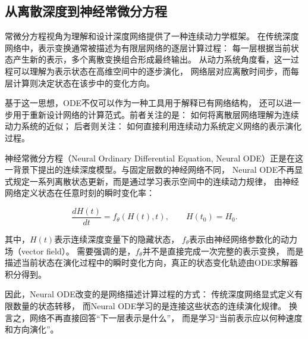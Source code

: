 \documentclass[UTF8,a4paper,zihao=-4,oneside,openany]{ctexbook}
\begin{document}
\subsection{从离散深度到神经常微分方程}

常微分方程视角为理解和设计深度网络提供了一种连续动力学框架。
在传统深度网络中，表示变换通常被描述为有限层网络的逐层计算过程：
每一层根据当前状态产生新的表示，多个离散变换组合形成最终输出。
从动力系统角度看，这一过程可以理解为表示状态在高维空间中的逐步演化，
网络层对应离散时间步，而每层计算则决定状态在该步中的变化方向。

基于这一思想，ODE不仅可以作为一种工具用于解释已有网络结构，
还可以进一步用于重新设计网络的计算范式。前者关注的是：
如何将离散层网络理解为连续动力系统的近似；
后者则关注：
如何直接利用连续动力系统定义网络的表示演化过程。

神经常微分方程（Neural Ordinary Differential Equation,
Neural ODE）正是在这一背景下提出的连续深度模型。与固定层数的神经网络不同，
Neural ODE不再显式规定一系列离散状态更新，而是通过学习表示空间中的连续动力规律，
由神经网络定义状态在任意时刻的瞬时变化率：

\begin{equation}
\frac{dH(t)}{dt}
=
f_\theta(H(t),t),
\qquad
H(t_0)=H_0 .
\end{equation}

其中，$H(t)$表示连续深度变量下的隐藏状态，
$f_\theta$表示由神经网络参数化的动力场（vector field）。
需要强调的是，$f_\theta$并不是直接完成一次完整的表示变换，
而是描述当前状态在演化过程中的瞬时变化方向，真正的状态变化轨迹由ODE求解器积分得到。

因此，Neural ODE改变的是网络描述计算过程的方式：
传统深度网络显式定义有限数量的状态转移，
而Neural ODE学习的是连接这些状态的连续演化规律。
换言之，网络不再直接回答“下一层表示是什么”，
而是学习“当前表示应以何种速度和方向演化”。
\end{document}
